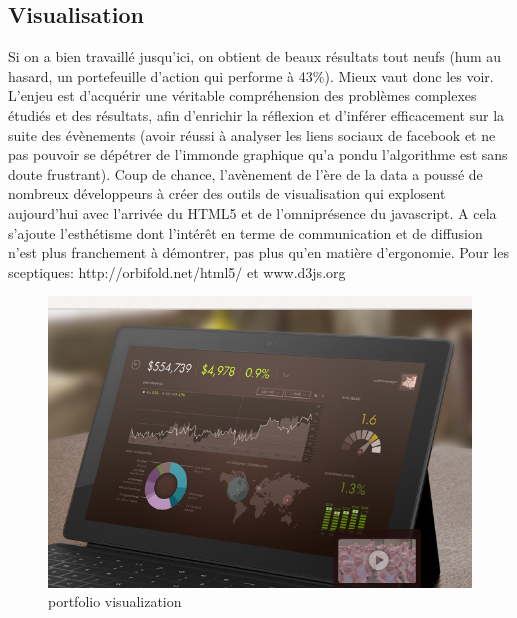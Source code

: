 \subsection{Visualisation}

  Si on a bien travaillé jusqu'ici, on obtient de beaux résultats
tout neufs (hum au hasard, un portefeuille d'action qui performe à
43\%). Mieux vaut donc les voir.
L'enjeu est d'acquérir une véritable compréhension des problèmes
complexes étudiés et des résultats, afin d'enrichir la réflexion
et d'inférer efficacement sur la suite des évènements (avoir réussi
à analyser les liens sociaux de facebook et ne pas pouvoir se dépétrer de l'immonde
graphique qu'a pondu l'algorithme est sans doute frustrant).\newline
Coup de chance, l'avènement de l'ère de la data a poussé de nombreux
développeurs à créer des outils de visualisation qui explosent aujourd'hui
avec l'arrivée du HTML5 et de l'omniprésence du javascript.\newline
A cela s'ajoute l'esthétisme dont l'intérêt en terme de communication et de
diffusion n'est plus franchement à démontrer, pas plus qu'en matière
d'ergonomie.\newline
Pour les sceptiques: http://orbifold.net/html5/ et www.d3js.org

\begin{figure}[H]
  \begin{center}
     \includegraphics[scale=0.3]{images/sigpig.png}
    \end{center}
    \caption{portfolio visualization}
    \label{fig:viz}
\end{figure}


